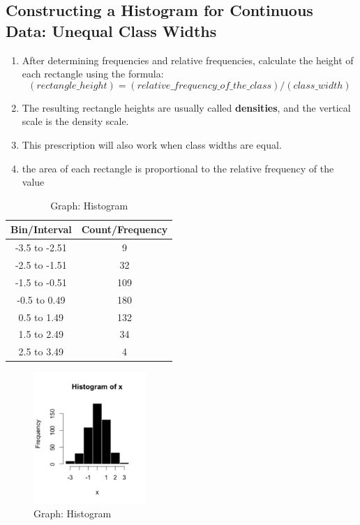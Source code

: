 \subsection{Constructing a Histogram for Continuous Data: Unequal Class Widths}
\begin{enumerate}
    \item After determining frequencies and relative frequencies, calculate the height of each rectangle using the formula:
    \begin{equation}
        (rectangle\_height) = (relative\_frequency\_of\_the\_class) / (class\_width)
    \end{equation}
    \item The resulting rectangle heights are usually called \textbf{densities}, and the vertical scale is the density scale. 
    \item This prescription will also work when class widths are equal. 
    \item the area of each rectangle is proportional to the relative frequency of the value
\end{enumerate}

\begin{table}[H]
    \begin{minipage}{0.45\textwidth}
        \centering
        \begin{tabular}{|c|c|}
            \hline
            Bin/Interval & Count/Frequency \\ \hline
            -3.5 to -2.51 & 9 \\ \hline
            -2.5 to -1.51 & 32 \\ \hline
            -1.5 to -0.51 & 109 \\ \hline
            -0.5 to 0.49 & 180 \\ \hline
            0.5 to 1.49 & 132 \\ \hline
            1.5 to 2.49 & 34 \\ \hline
            2.5 to 3.49 & 4 \\ \hline
        \end{tabular}
        \caption{Data: Histogram}
    \end{minipage}
    \hfill
    \begin{minipage}{0.45\textwidth}
        \begin{figure}[H]
            \centering
            \includegraphics[height=5cm]{Pictures/data/data_histogram.jpg}
            \caption{Graph: Histogram}
        \end{figure}
    \end{minipage}
\end{table}


